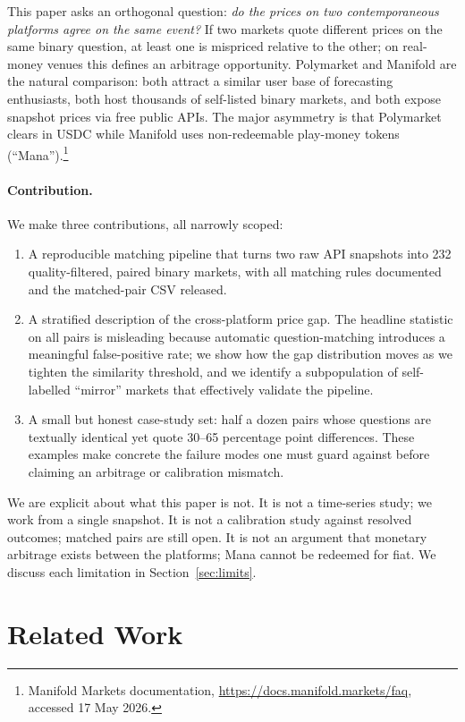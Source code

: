 \documentclass{article}
\begin{document}
This paper asks an orthogonal question: \emph{do the prices on two contemporaneous platforms agree on the same event?} If two markets quote different prices on the same binary question, at least one is mispriced relative to the other; on real-money venues this defines an arbitrage opportunity. Polymarket and Manifold are the natural comparison: both attract a similar user base of forecasting enthusiasts, both host thousands of self-listed binary markets, and both expose snapshot prices via free public APIs. The major asymmetry is that Polymarket clears in USDC \citep{tsang2026anatomy} while Manifold uses non-redeemable play-money tokens (``Mana'').\footnote{Manifold Markets documentation, \url{https://docs.manifold.markets/faq}, accessed 17 May 2026.}

\paragraph{Contribution.} We make three contributions, all narrowly scoped:
\begin{enumerate}
  \item A reproducible matching pipeline that turns two raw API snapshots into 232 quality-filtered, paired binary markets, with all matching rules documented and the matched-pair CSV released.
  \item A stratified description of the cross-platform price gap. The headline statistic on all pairs is misleading because automatic question-matching introduces a meaningful false-positive rate; we show how the gap distribution moves as we tighten the similarity threshold, and we identify a subpopulation of self-labelled ``mirror'' markets that effectively validate the pipeline.
  \item A small but honest case-study set: half a dozen pairs whose questions are textually identical yet quote 30--65 percentage point differences. These examples make concrete the failure modes one must guard against before claiming an arbitrage or calibration mismatch.
\end{enumerate}

We are explicit about what this paper is not. It is not a time-series study; we work from a single snapshot. It is not a calibration study against resolved outcomes; matched pairs are still open. It is not an argument that monetary arbitrage exists between the platforms; Mana cannot be redeemed for fiat. We discuss each limitation in Section~\ref{sec:limits}.

\section{Related Work}
\end{document}
